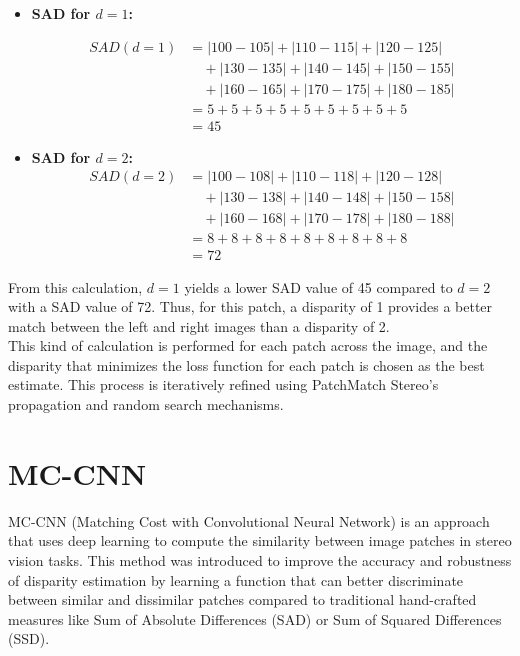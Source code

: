 \documentclass[22pt]{report}
\begin{document}
\begin{itemize}
    \item \textbf{SAD for \( d=1 \):}

\[
\begin{aligned}
SAD(d=1) &= |100 - 105| + |110 - 115| + |120 - 125| \\
         &\quad + |130 - 135| + |140 - 145| + |150 - 155| \\
         &\quad + |160 - 165| + |170 - 175| + |180 - 185| \\
         &= 5 + 5 + 5 + 5 + 5 + 5 + 5 + 5 + 5 \\
         &= 45
\end{aligned}
\]
    
    \item \textbf{SAD for \( d=2 \):}
    \[
\begin{aligned}
SAD(d=2) &= |100 - 108| + |110 - 118| + |120 - 128| \\
         &\quad + |130 - 138| + |140 - 148| + |150 - 158| \\
         &\quad + |160 - 168| + |170 - 178| + |180 - 188| \\
         &= 8 + 8 + 8 + 8 + 8 + 8 + 8 + 8 + 8 \\
         &= 72
\end{aligned}
\]
\end{itemize}
\vspace{15}
From this calculation, \( d=1 \) yields a lower SAD value of 45 compared to \( d=2 \) with a SAD value of 72. Thus, for this patch, a disparity of 1 provides a better match between the left and right images than a disparity of 2.\\

This kind of calculation is performed for each patch across the image, and the disparity that minimizes the loss function for each patch is chosen as the best estimate. This process is iteratively refined using PatchMatch Stereo's propagation and random search mechanisms.


\section{MC-CNN}
MC-CNN (Matching Cost with Convolutional Neural Network) is an approach that uses deep learning to compute the similarity between image patches in stereo vision tasks. This method was introduced to improve the accuracy and robustness of disparity estimation by learning a function that can better discriminate between similar and dissimilar patches compared to traditional hand-crafted measures like Sum of Absolute Differences (SAD) or Sum of Squared Differences (SSD).\\
\vspace{8}
\end{document}
